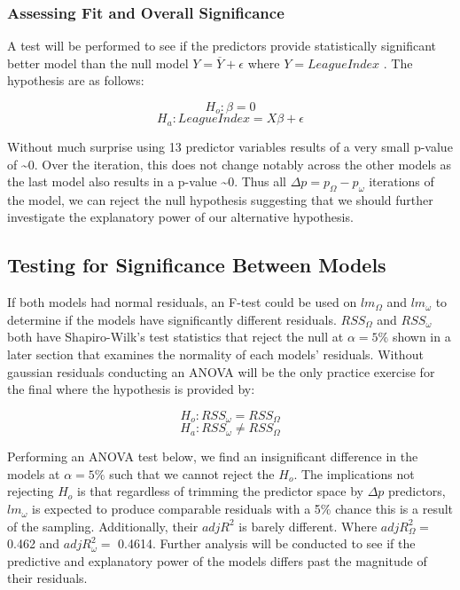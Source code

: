 \documentclass[]{article}
\begin{document}
\hypertarget{assessing-fit-and-overall-significance}{%
\subsubsection{Assessing Fit and Overall
Significance}\label{assessing-fit-and-overall-significance}}

A test will be performed to see if the predictors provide statistically
significant better model than the null model
\(Y=\overset{\_}{Y}+\epsilon\) where \(Y=LeagueIndex\) . The hypothesis
are as follows:

\[H_o:\beta=0\] \[H_a:LeagueIndex=X\beta+\epsilon\]

Without much surprise using 13 predictor variables results of a very
small p-value of \textasciitilde{}0. Over the iteration, this does not
change notably across the other models as the last model also results in
a p-value \textasciitilde{}0. Thus all \(\Delta p=p_\Omega-p_\omega\)
iterations of the model, we can reject the null hypothesis suggesting
that we should further investigate the explanatory power of our
alternative hypothesis.

\hypertarget{testing-for-significance-between-models}{%
\subsection{Testing for Significance Between
Models}\label{testing-for-significance-between-models}}

If both models had normal residuals, an F-test could be used on
\(lm_\Omega\) and \(lm_\omega\) to determine if the models have
significantly different residuals. \(RSS_\Omega\) and \(RSS_\omega\)
both have Shapiro-Wilk's test statistics that reject the null at
\(\alpha=5\%\) shown in a later section that examines the normality of
each models' residuals. Without gaussian residuals conducting an ANOVA
will be the only practice exercise for the final where the hypothesis is
provided by:

\[ H_o:RSS_\omega = RSS_\Omega\] \[ H_a:RSS_\omega \neq RSS_\Omega\]

Performing an ANOVA test below, we find an insignificant difference in
the models at \(\alpha=5\%\) such that we cannot reject the \(H_o\). The
implications not rejecting \(H_o\) is that regardless of trimming the
predictor space by \(\Delta p\) predictors, \(lm_\omega\) is expected to
produce comparable residuals with a 5\% chance this is a result of the
sampling. Additionally, their \(adjR^2\) is barely different. Where
\(adjR^2_\Omega=\) 0.462 and \(adjR^2_\omega=\) 0.4614. Further analysis
will be conducted to see if the predictive and explanatory power of the
models differs past the magnitude of their residuals.
\end{document}
